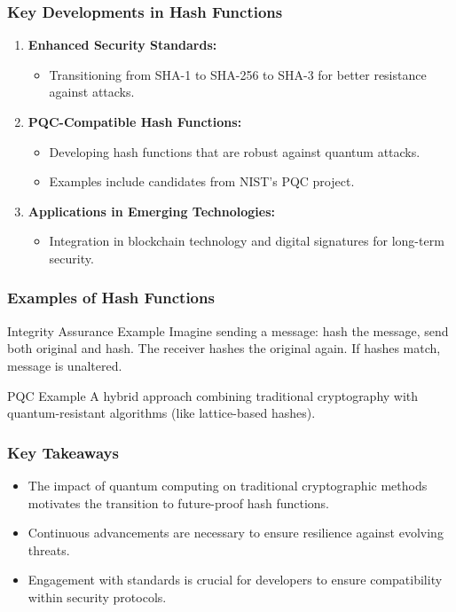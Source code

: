 \documentclass{beamer}
\begin{document}
\begin{frame}[fragile]
    \frametitle{Key Developments in Hash Functions}
    \begin{enumerate}
        \item \textbf{Enhanced Security Standards:}
            \begin{itemize}
                \item Transitioning from SHA-1 to SHA-256 to SHA-3 for better resistance against attacks.
            \end{itemize}
        \item \textbf{PQC-Compatible Hash Functions:}
            \begin{itemize}
                \item Developing hash functions that are robust against quantum attacks.
                \item Examples include candidates from NIST’s PQC project.
            \end{itemize}
        \item \textbf{Applications in Emerging Technologies:}
            \begin{itemize}
                \item Integration in blockchain technology and digital signatures for long-term security.
            \end{itemize}
    \end{enumerate}
\end{frame}

\begin{frame}[fragile]
    \frametitle{Examples of Hash Functions}
    \begin{block}{Integrity Assurance Example}
        Imagine sending a message: hash the message, send both original and hash. The receiver hashes the original again. If hashes match, message is unaltered.
    \end{block}
    \begin{block}{PQC Example}
        A hybrid approach combining traditional cryptography with quantum-resistant algorithms (like lattice-based hashes).
    \end{block}
\end{frame}

\begin{frame}[fragile]
    \frametitle{Key Takeaways}
    \begin{itemize}
        \item The impact of quantum computing on traditional cryptographic methods motivates the transition to future-proof hash functions.
        \item Continuous advancements are necessary to ensure resilience against evolving threats.
        \item Engagement with standards is crucial for developers to ensure compatibility within security protocols.
    \end{itemize}
\end{frame}
\end{document}
